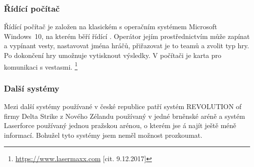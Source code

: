 \subsubsection{Řídící počítač}
Řídící počítač je založen na klasickém  s operačním systémem Microsoft Windows~10, na kterém běří řídící . Operátor jejím prostřednictvím může zapínat a vypínant vesty, nastavovat jména hráčů, přiřazovat je to teamů a zvolit typ hry. Po dokončení hry umožnuje  vytisknout výsledky. V počítači je  karta pro komunikaci s vestasmi.
\footnote{\url{https://www.lasermaxx.com} [cit. 9.12.2017]}

\subsubsection{Další systémy}
Mezi další systémy používané v české republice patří systém REVOLUTION of firmy Delta Strike z Nového Zélandu používaný v jedné brněnské aréně a systém Laserforce používaný jednou pražskou arénou, o kterém jse á najít ještě méně informací. Bohužel tyto systémy jsem neměl možnost prozkoumat.
